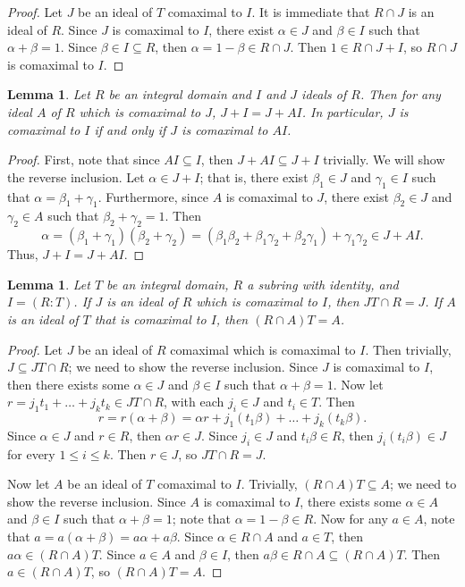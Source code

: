 \documentclass[12pt]{amsart}
\newtheorem{lemma}[theorem]{Lemma}
\theoremstyle{definition}
\begin{document}
\begin{proof}
    Let $J$ be an ideal of $T$ comaximal to $I$. It is immediate that $R\cap J$ is an ideal of $R$. Since $J$ is comaximal to $I$, there exist $\alpha\in J$ and $\beta\in I$ such that $\alpha+\beta=1$. Since $\beta\in I\subseteq R$, then $\alpha=1-\beta\in R\cap J$. Then $1\in R\cap J+I$, so $R\cap J$ is comaximal to $I$.
\end{proof}

\begin{lemma}
    \label{comaximal to AI}
    Let $R$ be an integral domain and $I$ and $J$ ideals of $R$. Then for any ideal $A$ of $R$ which is comaximal to $J$, $J+I=J+AI$. In particular, $J$ is comaximal to $I$ if and only if $J$ is comaximal to $AI$.
\end{lemma}

\begin{proof}
    First, note that since $AI\subseteq I$, then $J+AI\subseteq J+I$ trivially. We will show the reverse inclusion. Let $\alpha\in J+I$; that is, there exist $\beta_1\in J$ and $\gamma_1\in I$ such that $\alpha=\beta_1+\gamma_1$. Furthermore, since $A$ is comaximal to $J$, there exist $\beta_2\in J$ and $\gamma_2\in A$ such that $\beta_2+\gamma_2=1$. Then
    $$\alpha=(\beta_1+\gamma_1)(\beta_2+\gamma_2)=(\beta_1\beta_2+\beta_1\gamma_2+\beta_2\gamma_1)+\gamma_1\gamma_2\in J+AI.$$
    Thus, $J+I=J+AI$.
\end{proof}

\begin{lemma}
    \label{going up or going down}
    Let $T$ be an integral domain, $R$ a subring with identity, and $I=(R:T)$. If $J$ is an ideal of $R$ which is comaximal to $I$, then $JT\cap R=J$. If $A$ is an ideal of $T$ that is comaximal to $I$, then $(R\cap A)T=A$.
\end{lemma}

\begin{proof}
    Let $J$ be an ideal of $R$ comaximal which is comaximal to $I$. Then trivially, $J\subseteq JT\cap R$; we need to show the reverse inclusion. Since $J$ is comaximal to $I$, then there exists some $\alpha\in J$ and $\beta\in I$ such that $\alpha+\beta=1$. Now let $r=j_1t_1+\dots+j_kt_k\in JT\cap R$, with each $j_i\in J$ and $t_i\in T$. Then
    $$r=r(\alpha+\beta)=\alpha r+j_1(t_1\beta)+\dots+j_k(t_k\beta).$$
    Since $\alpha\in J$ and $r\in R$, then $\alpha r\in J$. Since $j_i\in J$ and $t_i\beta\in R$, then $j_i(t_i\beta)\in J$ for every $1\leq i\leq k$. Then $r\in J$, so $JT\cap R=J$.

    Now let $A$ be an ideal of $T$ comaximal to $I$. Trivially, $(R\cap A)T\subseteq A$; we need to show the reverse inclusion. Since $A$ is comaximal to $I$, there exists some $\alpha\in A$ and $\beta\in I$ such that $\alpha+\beta=1$; note that $\alpha=1-\beta\in R$. Now for any $a\in A$, note that $a=a(\alpha+\beta)=a\alpha+a\beta$. Since $\alpha\in R\cap A$ and $a\in T$, then $a\alpha\in (R\cap A)T$. Since $a\in A$ and $\beta\in I$, then $a\beta\in R\cap A\subseteq (R\cap A)T$. Then $a\in (R\cap A)T$, so $(R\cap A)T=A$.
\end{proof}
\end{document}
